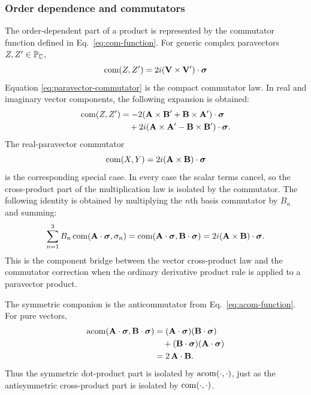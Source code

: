 \subsubsection{Order dependence and commutators}
The order-dependent part of a product is represented by the commutator
function defined in Eq.\ \eqref{eq:com-function}. For generic complex paravectors
\(Z,Z'\in\mathbb{P}_{\mathbb{C}}\),
\begin{equation}
\operatorname{com}\!\left(Z,Z'\right)
= 2i(\mathbf{V}\times\mathbf{V}')\cdot\mathbf{\bm{\sigma}}
\label{eq:paravector-commutator}
\end{equation}
Equation \eqref{eq:paravector-commutator} is the compact commutator law. In
real and imaginary vector components, the following expansion is obtained:
\begin{align*}
\operatorname{com}\!\left(Z,Z'\right)
&= -2(\mathbf{A}\times\mathbf{B}'+\mathbf{B}\times\mathbf{A}')\cdot\mathbf{\bm{\sigma}} \notag\\
&\quad +2i(\mathbf{A}\times\mathbf{A}'-\mathbf{B}\times\mathbf{B}')\cdot\mathbf{\bm{\sigma}}.
\end{align*}
The real-paravector commutator
\begin{equation*}
\operatorname{com}\!\left(X,Y\right)=2i(\mathbf{A}\times\mathbf{B})\cdot\mathbf{\bm{\sigma}}
\end{equation*}
is the corresponding special case. In every case the scalar terms cancel,
so the cross-product part of the multiplication law is isolated by the
commutator.
The following identity is obtained by multiplying the \(n\)th basis
commutator by \(B_n\) and summing:
\begin{equation}
\sum_{n=1}^3 B_n\operatorname{com}\!\left(\mathbf{A}\cdot\mathbf{\bm{\sigma}},\sigma_n\right)
=\operatorname{com}\!\left(\mathbf{A}\cdot\mathbf{\bm{\sigma}},\mathbf{B}\cdot\mathbf{\bm{\sigma}}\right)
=2i(\mathbf{A}\times\mathbf{B})\cdot\mathbf{\bm{\sigma}}.
\label{eq:sigma-commutator-contraction}
\end{equation}
This is the component bridge between the vector cross-product law and the
commutator correction when the ordinary derivative product rule is applied
to a paravector product.

The symmetric companion is the anticommutator from
Eq.\ \eqref{eq:acom-function}. For pure vectors,
\begin{align}
\operatorname{acom}\!\left(\mathbf{A}\cdot\mathbf{\bm{\sigma}},\mathbf{B}\cdot\mathbf{\bm{\sigma}}\right)
&=(\mathbf{A}\cdot\mathbf{\bm{\sigma}})(\mathbf{B}\cdot\mathbf{\bm{\sigma}})\notag\\
&\quad+(\mathbf{B}\cdot\mathbf{\bm{\sigma}})(\mathbf{A}\cdot\mathbf{\bm{\sigma}})\notag\\
&=2\,\mathbf{A}\cdot\mathbf{B}.
\label{eq:vector-anticommutator}
\end{align}
Thus the symmetric dot-product part is isolated by
\(\operatorname{acom}\!\left(\mathord\cdot,\mathord\cdot\right)\), just as the antisymmetric
cross-product part is isolated by \(\operatorname{com}\!\left(\mathord\cdot,\mathord\cdot\right)\).

